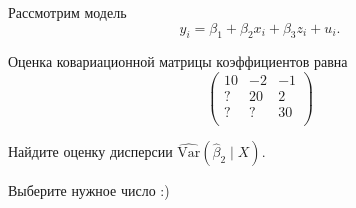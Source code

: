 
\begin{question}
Рассмотрим модель
\[
y_i = \beta_1 + \beta_2 x_i + \beta_3 z_i + u_i.
\]

Оценка ковариационной матрицы коэффициентов равна
\[
\begin{pmatrix}
10 & -2 & -1 \\
? & 20 & 2 \\
? & ? & 30 \\
\end{pmatrix}
\]

Найдите оценку дисперсии \(\widehat{\mathrm{Var}}(\hat \beta_2 \mid X)\).
\end{question}

\begin{solution}
Выберите нужное число :)
\end{solution}

